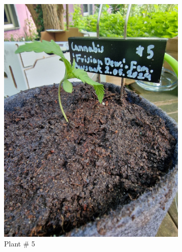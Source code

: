 \begin{figure}[htbp]
\begin{subfigure}[t]{.19\textwidth}
        \includegraphics[width=\linewidth]{plant_05_2024-05-13}
        \caption{Plant \# 5}
        \label{fig:plant_05_2024-05-13}
    \end{subfigure}
    \begin{subfigure}[t]{.19\textwidth}

\end{subfigure}
\end{figure}
